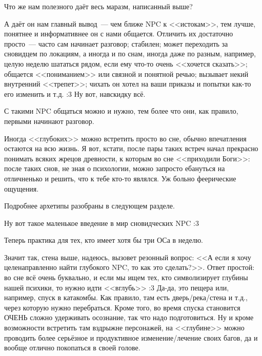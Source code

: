 \documentclass[a5paper,12pt,twoside]{memoir}
\begin{document}
Что же нам полезного даёт весь маразм, написанный выше?

А даёт он нам главный вывод~--- чем ближе NPC к <<истокам>>, тем лучше, понятнее и информативнее он с нами общается. Отличить их достаточно просто~--- часто сам начинает разговор; стабилен; может переходить за сновидцем по локациям, а иногда и по снам, иногда даже по разным, например, целую неделю шататься рядом, если ему что-то очень <<хочется сказать>>; общается <<пониманием>> или связной и понятной речью; вызывает некий внутренний <<трепет>>; чихать он хотел на ваши приказы и попытки как-то его изменить и т.д. :3 Ну вот, навскидку всё.

С такими NPC общаться можно и нужно, тем более что они, как правило, первыми начинают разговор. 

Иногда <<глубоких>> можно встретить просто во сне, обычно впечатления остаются на всю жизнь. Я вот, кстати, после пары таких встреч начал прекрасно понимать всяких жрецов древности, к которым во сне <<приходили Боги>>: после таких снов, не зная о психологии, можно запросто ебануться на отличненько и решить, что к тебе кто-то являлся. Уж больно феерические ощущения.

Подробнее архетипы разобраны в следующем разделе.

Ну вот такое маленькое введение в мир сновидческих NPC :3 

Теперь практика для тех, кто имеет хотя бы три ОСа в неделю.

Значит так, стена выше, надеюсь, вызовет резонный вопрос: <<А если я хочу целенаправленно найти глубокого NPC, то как это сделать?>>. Ответ простой: во сне всё очень буквально, и если мы ищем тех, кто символизирует глубины нашей психики, то нужно идти <<вглубь>> :3 Да-да, это пещера или, например, спуск в катакомбы. Как правило, там есть дверь/река/стена и т.д., через которую нужно перебраться. Кроме того, во время спуска становится ОЧЕНЬ сложно удерживать осознание, так что надо подготовиться. Ну и кроме возможности встретить там вздрыжне персонажей, на <<глубине>> можно проводить более серьёзное и продуктивное изменение/лечение своих багов, да и вообще отлично покопаться в своей голове. 
\end{document}
